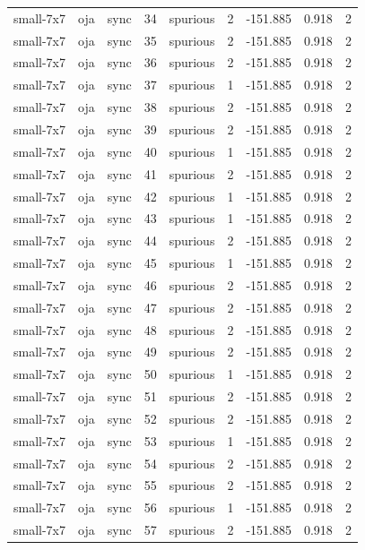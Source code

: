 \begin{tabular}{lllrlrrrr}
small-7x7 & oja & sync & 34 & spurious & 2 & -151.885 & 0.918 & 2 \\
small-7x7 & oja & sync & 35 & spurious & 2 & -151.885 & 0.918 & 2 \\
small-7x7 & oja & sync & 36 & spurious & 2 & -151.885 & 0.918 & 2 \\
small-7x7 & oja & sync & 37 & spurious & 1 & -151.885 & 0.918 & 2 \\
small-7x7 & oja & sync & 38 & spurious & 2 & -151.885 & 0.918 & 2 \\
small-7x7 & oja & sync & 39 & spurious & 2 & -151.885 & 0.918 & 2 \\
small-7x7 & oja & sync & 40 & spurious & 1 & -151.885 & 0.918 & 2 \\
small-7x7 & oja & sync & 41 & spurious & 2 & -151.885 & 0.918 & 2 \\
small-7x7 & oja & sync & 42 & spurious & 1 & -151.885 & 0.918 & 2 \\
small-7x7 & oja & sync & 43 & spurious & 1 & -151.885 & 0.918 & 2 \\
small-7x7 & oja & sync & 44 & spurious & 2 & -151.885 & 0.918 & 2 \\
small-7x7 & oja & sync & 45 & spurious & 1 & -151.885 & 0.918 & 2 \\
small-7x7 & oja & sync & 46 & spurious & 2 & -151.885 & 0.918 & 2 \\
small-7x7 & oja & sync & 47 & spurious & 2 & -151.885 & 0.918 & 2 \\
small-7x7 & oja & sync & 48 & spurious & 2 & -151.885 & 0.918 & 2 \\
small-7x7 & oja & sync & 49 & spurious & 2 & -151.885 & 0.918 & 2 \\
small-7x7 & oja & sync & 50 & spurious & 1 & -151.885 & 0.918 & 2 \\
small-7x7 & oja & sync & 51 & spurious & 2 & -151.885 & 0.918 & 2 \\
small-7x7 & oja & sync & 52 & spurious & 2 & -151.885 & 0.918 & 2 \\
small-7x7 & oja & sync & 53 & spurious & 1 & -151.885 & 0.918 & 2 \\
small-7x7 & oja & sync & 54 & spurious & 2 & -151.885 & 0.918 & 2 \\
small-7x7 & oja & sync & 55 & spurious & 2 & -151.885 & 0.918 & 2 \\
small-7x7 & oja & sync & 56 & spurious & 1 & -151.885 & 0.918 & 2 \\
small-7x7 & oja & sync & 57 & spurious & 2 & -151.885 & 0.918 & 2 \\

\end{tabular}
